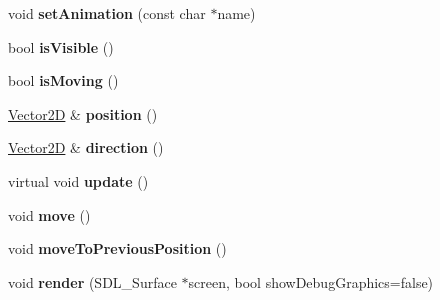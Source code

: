 \begin{DoxyCompactItemize}
\item 
\hypertarget{class_entity_ad1e7b83b2f35e78e84b1705937309fe9}{void {\bfseries set\-Animation} (const char $\ast$name)}\label{class_entity_ad1e7b83b2f35e78e84b1705937309fe9}

\item 
\hypertarget{class_entity_a098d827982916bd7b3d13f6858c520d7}{bool {\bfseries is\-Visible} ()}\label{class_entity_a098d827982916bd7b3d13f6858c520d7}

\item 
\hypertarget{class_entity_aa208f77af13f749357d0151fdb5f8b34}{bool {\bfseries is\-Moving} ()}\label{class_entity_aa208f77af13f749357d0151fdb5f8b34}

\item 
\hypertarget{class_entity_a1183593ad58f48225058ba545880e834}{\hyperlink{class_vector2_d}{Vector2\-D} \& {\bfseries position} ()}\label{class_entity_a1183593ad58f48225058ba545880e834}

\item 
\hypertarget{class_entity_a4d0d62c67cdf86694c45333608922eb0}{\hyperlink{class_vector2_d}{Vector2\-D} \& {\bfseries direction} ()}\label{class_entity_a4d0d62c67cdf86694c45333608922eb0}

\item 
\hypertarget{class_entity_aed73e98b980b85833428c935cc1c69f8}{virtual void {\bfseries update} ()}\label{class_entity_aed73e98b980b85833428c935cc1c69f8}

\item 
\hypertarget{class_entity_ac1f12a5f7922624ee7ced15be3b884de}{void {\bfseries move} ()}\label{class_entity_ac1f12a5f7922624ee7ced15be3b884de}

\item 
\hypertarget{class_entity_a2fc98106ec767b2d2a6fbd9377f8750f}{void {\bfseries move\-To\-Previous\-Position} ()}\label{class_entity_a2fc98106ec767b2d2a6fbd9377f8750f}

\item 
\hypertarget{class_entity_a7fef3cd0e1983019e27047d2cceb0f1d}{void {\bfseries render} (S\-D\-L\-\_\-\-Surface $\ast$screen, bool show\-Debug\-Graphics=false)}\label{class_entity_a7fef3cd0e1983019e27047d2cceb0f1d}

\end{DoxyCompactItemize}
